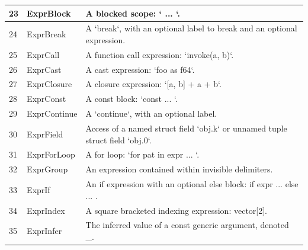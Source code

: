 \begin{longtable}{| p{} | p{} | p{} |}
23    & ExprBlock                      & A blocked scope: `{ ... }`.                                                                                    \\ \hline
24    & ExprBreak                      & A `break`, with an optional label to break and an optional expression.                                         \\ \hline
25    & ExprCall                       & A function call expression: `invoke(a, b)`.                                                                    \\ \hline
26    & ExprCast                       & A cast expression: `foo as f64`.                                                                               \\ \hline
27    & ExprClosure                    & A closure expression: `[a, b] + a + b`.                                                                        \\ \hline
28    & ExprConst                      & A const block: `const { ... }`.                                                                                \\ \hline
29    & ExprContinue                   & A `continue`, with an optional label.                                                                          \\ \hline
30    & ExprField                      & Access of a named struct field `obj.k` or unnamed tuple struct field `obj.0`.                                  \\ \hline
31    & ExprForLoop                    & A for loop: `for pat in expr { ... }`.                                                                         \\ \hline
32    & ExprGroup                      & An expression contained within invisible delimiters.                                                           \\ \hline
33    & ExprIf                         & An if expression with an optional else block: if expr { ... } else { ... }.                                    \\ \hline
34    & ExprIndex                      & A square bracketed indexing expression: vector[2].                                                             \\ \hline
35    & ExprInfer                      & The inferred value of a const generic argument, denoted \_.                                                    \\ \hline

\end{longtable}
